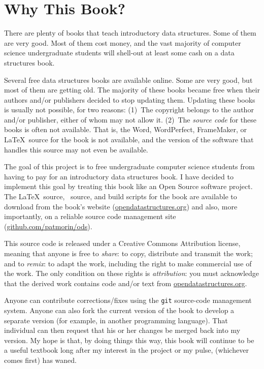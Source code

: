 \chapter*{Why This Book?}

There are plenty of books that teach introductory data structures.
Some of them are very good.  Most of them cost money, and the vast
majority of computer science undergraduate students will shell-out at
least some cash on a data structures book.

Several free data structures books are available online.  Some are very
good, but most of them are getting old.  The majority of these books
became free when their authors and/or publishers decided to stop updating
them.  Updating these books is usually not possible, for two reasons:
(1)~The copyright belongs to the author and/or publisher, either of whom
may not allow it.  (2)~The \emph{source code} for these books is often
not available.  That is, the Word, WordPerfect, FrameMaker, or \LaTeX\
source for the book is not available, and the version of the software
that handles this source may not even be available.

The goal of this project is to free undergraduate computer science
students from having to pay for an introductory data structures book.
I have decided to implement this goal by treating this book like an Open
Source software project.  The \LaTeX\ source, \lang\ source, and build
scripts for the book are available to download from the book's website
(\url{opendatastructures.org}) and also, more importantly, on a reliable
source code management site (\url{github.com/patmorin/ods}).

This source code is released under a Creative Commons Attribution license,
meaning that anyone is free to \emph{share}: to copy, distribute and
transmit the work; and to \emph{remix}: to adapt the work, including the
right to make commercial use of the work.  The only condition on these
rights is \emph{attribution}: you must acknowledge that the derived work
contains code and/or text from \url{opendatastructures.org}.

Anyone can contribute corrections/fixes using the \texttt{git} source-code
management system.  Anyone can also fork the current version of the
book to develop a separate version (for example, in another programming
language).  That individual can then request that his or her changes be
merged back into my version.  My hope is that, by doing things this way,
this book will continue to be a useful textbook long after my interest
in the project or my pulse, (whichever comes first) has waned.



